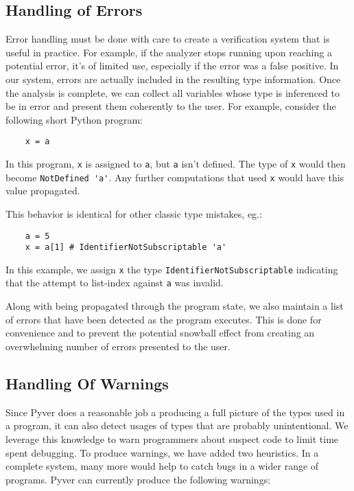 \documentclass{article}[12pt]
\begin{document}
\subsection{Handling of Errors}

Error handling must be done with care to create a verification system that is useful in practice.
For example, if the analyzer stops running upon reaching a potential error, it's of limited use,
especially if the error was a false positive. In our system, errors are actually included in the
resulting type information. Once the analysis is complete, we can collect all variables whose type
is inferenced to be in error and present them coherently to the user. For example, consider the
following short Python program:

\begin{verbatim}
    x = a
\end{verbatim}
In this program, \verb=x= is assigned to \verb=a=, but \verb=a= isn't defined. The type of
\verb=x= would then become \verb=NotDefined 'a'=. Any further computations that used \verb=x= would
have this value propagated.

This behavior is identical for other classic type mistakes, eg.:
\begin{verbatim}
    a = 5
    x = a[1] # IdentifierNotSubscriptable 'a'
\end{verbatim}
In this example, we assign \verb=x= the type \texttt{IdentifierNotSubscriptable} indicating that the attempt to
list-index against \texttt{a} was invalid.

Along with being propagated through the program state, we also maintain a list of errors that have
been detected as the program executes. This is done for convenience and to prevent the potential
snowball effect from creating an overwhelming number of errors presented to the user.

\subsection{Handling Of Warnings}
Since Pyver does a reasonable job a producing a full picture of the types used in a program, it
can also detect usages of types that are probably unintentional. We leverage this knowledge to warn
programmers about suspect code to limit time spent debugging. To produce warnings, we have added two
heuristics. In a complete system, many more would
help to catch bugs in a wider range of programs. Pyver can currently produce the following warnings:
\end{document}
